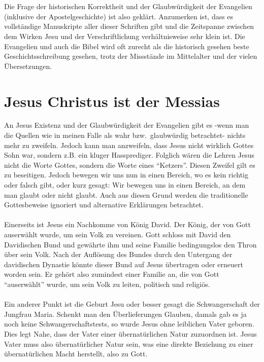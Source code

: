 \\~\\
Die Frage der historischen Korrektheit und der Glaubwürdigkeit der Evangelien (inklusive der Apostelgeschichte) ist also geklärt. Anzumerken ist, dass es vollständige Manuskripte aller dieser Schriften gibt und die Zeitspanne zwischen dem Wirken Jesu und der Verschriftlichung verhältnisweise sehr klein ist. Die Evangelien und auch die Bibel wird oft zurecht als die historisch gesehen beste Geschichtsschreibung gesehen, trotz der Missstände im Mittelalter und der vielen Übersetzungen.

\section{Jesus Christus ist der Messias}
An Jesus Existenz und der Glaubwürdigkeit der Evangelien gibt es -wenn man die Quellen wie in meinen Falle als wahr bzw.\ glaubwürdig betrachtet- nichts mehr zu zweifeln. Jedoch kann man anzweifeln, dass Jesus nicht wirklich Gottes Sohn war, sondern z.B. ein kluger Hassprediger. Folglich wären die Lehren Jesus nicht die Worte Gottes, sondern die Worte eines ``Ketzers''. Diesen Zweifel gilt es zu beseitigen. Jedoch bewegen wir uns nun in einen Bereich, wo es kein richtig oder falsch gibt, oder kurz gesagt: Wir bewegen uns in einen Bereich, an dem man glaubt oder nicht glaubt. Auch aus diesen Grund werden die traditionelle Gottesbeweise ignoriert und alternative Erklärungen betrachtet.
\\~\\
Einerseits ist Jesus ein Nachkomme von König David. Der König, der von Gott auserwählt wurde, um sein Volk  zu vereinen. Gott schloss mit David den Davidischen Bund und gewährte ihm und seine Familie bedingungslos den Thron über sein Volk. Nach der Auflösung des Bundes durch den Untergang der davidischen Dynastie könnte dieser Bund auf Jesus übertragen oder erneuert worden sein. Er gehört also zumindest einer Familie an, die von Gott ``auserwählt'' wurde, um sein Volk zu leiten, politisch und religiös.
\\~\\
Ein anderer Punkt ist die Geburt Jesu oder besser gesagt die Schwangerschaft der Jungfrau Maria. Schenkt man den Überlieferungen Glauben, damals gab es ja noch keine Schwangerschaftstests, so wurde Jesus ohne leiblichen Vater geboren. Dies legt Nahe, dass der Vater  einer übernatürlichen Natur zuzuordnen ist. Jesus Vater muss also übernatürlicher Natur sein, was eine direkte Beziehung zu einer übernatürlichen Macht herstellt, also zu Gott.
